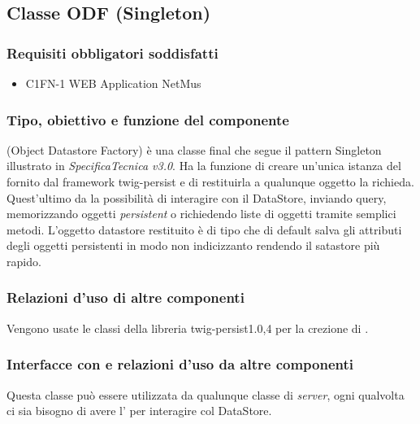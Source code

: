 \subsection{Classe ODF (Singleton)}
\subsubsection*{Requisiti obbligatori soddisfatti}
\begin{itemize}
	\item C1FN-1 WEB Application NetMus
\end{itemize}
\subsubsection*{Tipo, obiettivo e funzione del componente}
 (Object Datastore Factory) \`e una classe final che segue il pattern
Singleton illustrato in \emph{SpecificaTecnica v3.0}. Ha la funzione di creare un'unica istanza del
 fornito dal framework twig-persist e di restituirla a
qualunque oggetto la richieda. Quest'ultimo da la possibilit\`a di interagire con il DataStore, inviando query, memorizzando oggetti \emph{persistent} o richiedendo liste di oggetti
tramite semplici metodi. L'oggetto datastore restituito \`e di tipo
 che di default salva gli attributi degli oggetti
persistenti in modo non indicizzanto rendendo il satastore pi\`u rapido.
\subsubsection*{Relazioni d'uso di altre componenti}
Vengono usate le classi della libreria twig-persist1.0,4 per la crezione di
.
\subsubsection*{Interfacce con e relazioni d'uso da altre componenti}
Questa classe pu\`o essere utilizzata da qualunque classe di \emph{server}, ogni
qualvolta ci sia bisogno di avere l'  per interagire col
DataStore.
